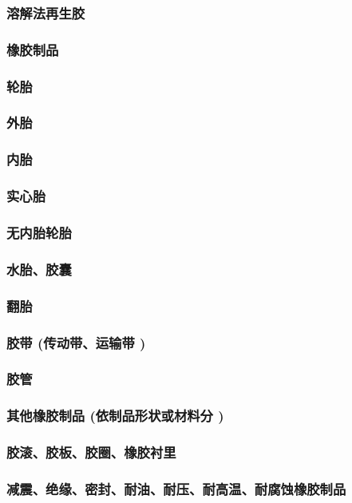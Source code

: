 \documentclass[UTF8]{../../ApplicationUniverse}
\begin{document}
    \subsubsection{溶解法再生胶}
\subsubsection{橡胶制品}
    \subsubsection{轮胎}
        \subsubsection{外胎}
        \subsubsection{内胎}
        \subsubsection{实心胎}
        \subsubsection{无内胎轮胎}
        \subsubsection{水胎、胶囊}
        \subsubsection{翻胎}
    \subsubsection{胶带 (传动带、运输带 )}
    \subsubsection{胶管}
    \subsubsection{其他橡胶制品 (依制品形状或材料分 )}
        \subsubsection{胶滚、胶板、胶圈、橡胶衬里}
        \subsubsection{减震、绝缘、密封、耐油、耐压、耐高温、耐腐蚀橡胶制品}
\end{document}
